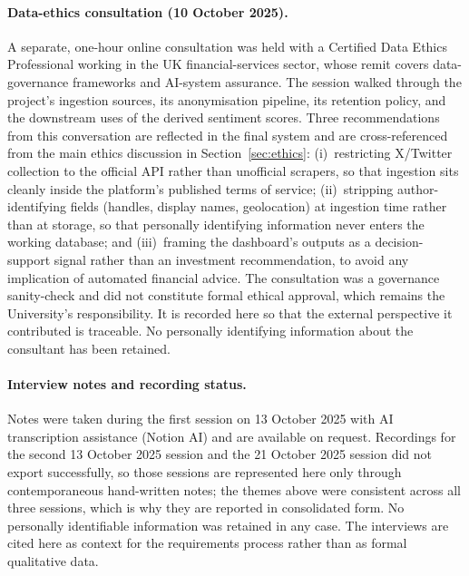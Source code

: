 \paragraph{Data-ethics consultation (10 October 2025).}
A separate, one-hour online consultation was held with a Certified Data Ethics Professional working in the UK financial-services sector, whose remit covers data-governance frameworks and AI-system assurance. The session walked through the project's ingestion sources, its anonymisation pipeline, its retention policy, and the downstream uses of the derived sentiment scores. Three recommendations from this conversation are reflected in the final system and are cross-referenced from the main ethics discussion in Section~\ref{sec:ethics}: (i)~restricting X/Twitter collection to the official API rather than unofficial scrapers, so that ingestion sits cleanly inside the platform's published terms of service; (ii)~stripping author-identifying fields (handles, display names, geolocation) at ingestion time rather than at storage, so that personally identifying information never enters the working database; and (iii)~framing the dashboard's outputs as a decision-support signal rather than an investment recommendation, to avoid any implication of automated financial advice. The consultation was a governance sanity-check and did not constitute formal ethical approval, which remains the University's responsibility. It is recorded here so that the external perspective it contributed is traceable. No personally identifying information about the consultant has been retained.

\paragraph{Interview notes and recording status.}
Notes were taken during the first session on 13 October 2025 with AI transcription assistance (Notion AI) and are available on request. Recordings for the second 13 October 2025 session and the 21 October 2025 session did not export successfully, so those sessions are represented here only through contemporaneous hand-written notes; the themes above were consistent across all three sessions, which is why they are reported in consolidated form. No personally identifiable information was retained in any case. The interviews are cited here as context for the requirements process rather than as formal qualitative data.
